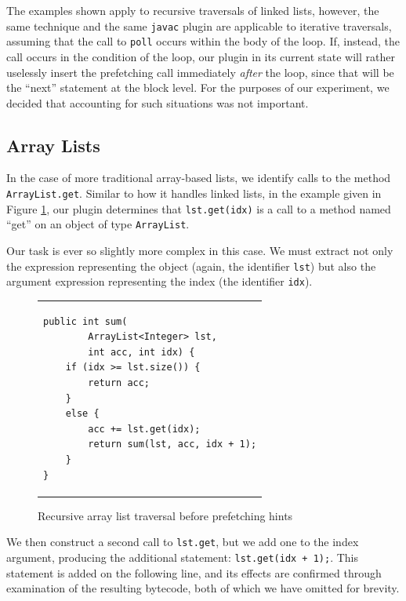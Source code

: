 \documentclass[journal]{IEEEtran}
\begin{document}
The examples shown apply to recursive traversals of linked lists, however, the same technique and the same \texttt{javac} plugin are applicable to iterative traversals, assuming that the call to \texttt{poll} occurs within the body of the loop. If, instead, the call occurs in the condition of the loop, our plugin in its current state will rather uselessly insert the prefetching call immediately \textit{after} the loop, since that will be the ``next'' statement at the block level. For the purposes of our experiment, we decided that accounting for such situations was not important.

\subsection{Array Lists}

In the case of more traditional array-based lists, we identify calls to the method \texttt{ArrayList.get}. Similar to how it handles linked lists, in the example given in Figure \ref{fig:alBefore}, our plugin determines that \lstinline{lst.get(idx)} is a call to a method named ``get'' on an object of type \texttt{ArrayList}.

Our task is ever so slightly more complex in this case. We must extract not only the expression representing the object (again, the identifier \texttt{lst}) but also the argument expression representing the index (the identifier \texttt{idx}).

\begin{figure}[h]
{\begin{tabular}{@{\hspace{1.5em}}l}
\begin{lstlisting}
public int sum(
        ArrayList<Integer> lst,
        int acc, int idx) {
    if (idx >= lst.size()) {
        return acc;
    }
    else {
        acc += lst.get(idx);
        return sum(lst, acc, idx + 1);
    }
}
\end{lstlisting}
\end{tabular}}
\caption{\small Recursive array list traversal before prefetching hints}
\label{fig:alBefore}
\end{figure}

We then construct a second call to \texttt{lst.get}, but we add one to the index argument, producing the additional statement: \lstinline{lst.get(idx + 1);}. This statement is added on the following line, and its effects are confirmed through examination of the resulting bytecode, both of which we have omitted for brevity.
\end{document}
